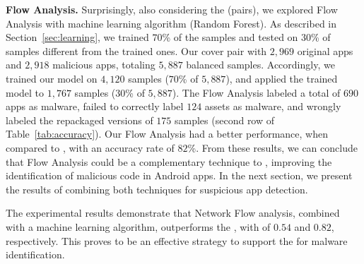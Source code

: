 {\bf Flow Analysis.} Surprisingly, also considering the \cds (\apps pairs), we explored Flow Analysis with machine learning algorithm (Random Forest). As described in Section~\ref{sec:learning}, we trained $70$\% of the samples and tested on $30$\% of samples different from the trained ones. Our \cds cover \apps pair with $2,969$ original apps and $2,918$ malicious apps, totaling $5,887$ balanced samples. Accordingly, we trained our model on $4,120$ samples ($70$\% of $5,887$), and applied the trained model to $1,767$ samples ($30$\% of $5,887$). The Flow Analysis labeled a total of $690$ apps as malware, failed to correctly label $124$ assets as malware, and wrongly labeled the repackaged versions of $175$ samples (second row of Table~\ref{tab:accuracy}). Our Flow Analysis had a better performance, when compared to \mas, with an accuracy rate of $82$\%. From these results, we can conclude that Flow Analysis could be a complementary technique to \mas, improving the identification of malicious code in Android apps. In the next section, we present the results of combining both techniques for suspicious app detection.

\begin{finding}
The experimental results demonstrate that Network Flow analysis, combined with a machine learning algorithm, outperforms the \mas, with \fone  of $0.54$ and $0.82$, respectively. This proves to be an effective strategy to support the \mas for malware identification.
\end{finding}


\begin{table}[h]
  \caption{Accuracy of both strategy on \cds.}
  \label{tab:accuracy}
\end{table}


